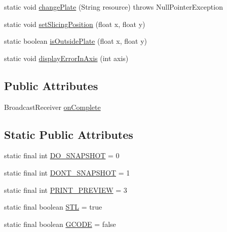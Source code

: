 \begin{DoxyCompactItemize}
\item 
static void \hyperlink{classandroid_1_1app_1_1printerapp_1_1viewer_1_1_viewer_main_fragment_ac706af1277a64ad2780e78a8aeee5c6e}{change\+Plate} (String resource)  throws Null\+Pointer\+Exception 
\item 
static void \hyperlink{classandroid_1_1app_1_1printerapp_1_1viewer_1_1_viewer_main_fragment_a7b7c9ec52da50e1355dba48e067e1b05}{set\+Slicing\+Position} (float x, float y)
\item 
static boolean \hyperlink{classandroid_1_1app_1_1printerapp_1_1viewer_1_1_viewer_main_fragment_ad34fa70aeeec5633d6291b5ba83535c7}{is\+Outside\+Plate} (float x, float y)
\item 
static void \hyperlink{classandroid_1_1app_1_1printerapp_1_1viewer_1_1_viewer_main_fragment_a0eb300dfd19698f2df89d4a83c4867e5}{display\+Error\+In\+Axis} (int axis)
\end{DoxyCompactItemize}
\subsection*{Public Attributes}
\begin{DoxyCompactItemize}
\item 
Broadcast\+Receiver \hyperlink{classandroid_1_1app_1_1printerapp_1_1viewer_1_1_viewer_main_fragment_ad3cd24a6495d29f84ba69e3cffb05dc7}{on\+Complete}
\end{DoxyCompactItemize}
\subsection*{Static Public Attributes}
\begin{DoxyCompactItemize}
\item 
static final int \hyperlink{classandroid_1_1app_1_1printerapp_1_1viewer_1_1_viewer_main_fragment_ab13b3089daa3a4175ca882943a2c55bd}{D\+O\+\_\+\+S\+N\+A\+P\+S\+H\+OT} = 0
\item 
static final int \hyperlink{classandroid_1_1app_1_1printerapp_1_1viewer_1_1_viewer_main_fragment_a6c4b37aa83d7a61349bbc61c2763332e}{D\+O\+N\+T\+\_\+\+S\+N\+A\+P\+S\+H\+OT} = 1
\item 
static final int \hyperlink{classandroid_1_1app_1_1printerapp_1_1viewer_1_1_viewer_main_fragment_a35fadb136145b0c1ab453cf6335e57e3}{P\+R\+I\+N\+T\+\_\+\+P\+R\+E\+V\+I\+EW} = 3
\item 
static final boolean \hyperlink{classandroid_1_1app_1_1printerapp_1_1viewer_1_1_viewer_main_fragment_ac118bd371490a2a8a61d62d3b8dfa20b}{S\+TL} = true
\item 
static final boolean \hyperlink{classandroid_1_1app_1_1printerapp_1_1viewer_1_1_viewer_main_fragment_ab4260d234c1658607b4d61fa414d64ef}{G\+C\+O\+DE} = false
\end{DoxyCompactItemize}


